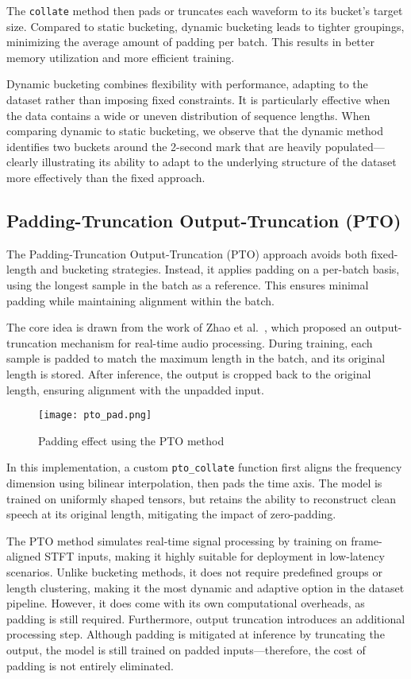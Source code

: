 The \texttt{collate} method then pads or truncates each waveform to its bucket's target size. Compared to static bucketing, dynamic bucketing leads to tighter groupings, minimizing the average amount of padding per batch. This results in better memory utilization and more efficient training.

Dynamic bucketing combines flexibility with performance, adapting to the dataset rather than imposing fixed constraints. It is particularly effective when the data contains a wide or uneven distribution of sequence lengths. When comparing dynamic to static bucketing, we observe that the dynamic method identifies two buckets around the 2-second mark that are heavily populated—clearly illustrating its ability to adapt to the underlying structure of the dataset more effectively than the fixed approach.

\subsection{Padding-Truncation Output-Truncation (PTO)}
\label{subsec:pto_dataset}

The Padding-Truncation Output-Truncation (PTO) approach avoids both fixed-length and bucketing strategies. Instead, it applies padding on a per-batch basis, using the longest sample in the batch as a reference. This ensures minimal padding while maintaining alignment within the batch.

The core idea is drawn from the work of Zhao et al.~\cite{applsci1004092}, which proposed an output-truncation mechanism for real-time audio processing. During training, each sample is padded to match the maximum length in the batch, and its original length is stored. After inference, the output is cropped back to the original length, ensuring alignment with the unpadded input.

\begin{figure}[H]
    \centering
    \texttt{[image: pto\_pad.png]}
    \caption{Padding effect using the PTO method}
    \label{fig:pto_pad}
\end{figure}

In this implementation, a custom \texttt{pto\_collate} function first aligns the frequency dimension using bilinear interpolation, then pads the time axis. The model is trained on uniformly shaped tensors, but retains the ability to reconstruct clean speech at its original length, mitigating the impact of zero-padding.

The PTO method simulates real-time signal processing by training on frame-aligned STFT inputs, making it highly suitable for deployment in low-latency scenarios. Unlike bucketing methods, it does not require predefined groups or length clustering, making it the most dynamic and adaptive option in the dataset pipeline. However, it does come with its own computational overheads, as padding is still required. Furthermore, output truncation introduces an additional processing step. Although padding is mitigated at inference by truncating the output, the model is still trained on padded inputs—therefore, the cost of padding is not entirely eliminated.


